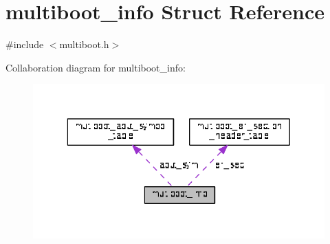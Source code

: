 \hypertarget{structmultiboot__info}{}\section{multiboot\+\_\+info Struct Reference}
\label{structmultiboot__info}


{\ttfamily \#include $<$multiboot.\+h$>$}



Collaboration diagram for multiboot\+\_\+info\+:\nopagebreak
\begin{figure}[H]
\begin{center}
\leavevmode
\includegraphics[width=336pt]{structmultiboot__info__coll__graph}
\end{center}
\end{figure}
